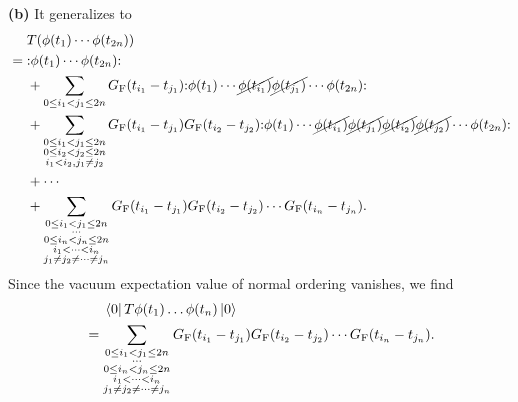 \documentclass{article}
\makeatletter
\newcommand*{\shifttext}[1]{%
  \settowidth{\@tempdima}{#1}%
  \hspace{-\@tempdima}#1%
}
\newcommand{\plabel}[1]{%
\shifttext{\textbf{#1}\quad}%
}
\makeatother
\begin{document}
\plabel{(b)}%
It generalizes to
\begin{align*}
    &\phantom{{}={}} T(\phi(t_1) \cdots \phi(t_{2n})) \\
    &= \normord{\phi(t_1) \cdots \phi(t_{2n})} \\
    &\phantom{{}={}} {} + \sum_{0\le i_1 < j_1 \le 2n} G_{\mathrm{F}}(t_{i_1} - t_{j_1}) \normord{\phi(t_1) \cdots \cancel{\phi(t_{i_1})} \cancel{\phi(t_{j_1})} \cdots \phi(t_{2n})} \\
    &\phantom{{}={}} {} + \sum_{\substack{0\le i_1 < j_1 \le 2n \\ 0\le i_2 < j_2 \le 2n \\ i_1 < i_2, j_1 \neq j_2}} G_{\mathrm{F}}(t_{i_1} - t_{j_1}) G_{\mathrm{F}}(t_{i_2} - t_{j_2}) \normord{\phi(t_1) \cdots \cancel{\phi(t_{i_1})} \cancel{\phi(t_{j_1})} \cancel{\phi(t_{i_2})} \cancel{\phi(t_{j_2})} \cdots \phi(t_{2n})} \\
    &\phantom{{}={}} + \cdots \\
    &\phantom{{}={}} + \sum_{\substack{0\le i_1 < j_1 \le 2n \\ \cdots \\ 0\le i_n < j_n \le 2n \\ i_1 < \cdots < i_n \\ j_1 \neq j_2 \neq \cdots \neq j_n}} G_{\mathrm{F}}(t_{i_1} - t_{j_1}) G_{\mathrm{F}}(t_{i_2} - t_{j_2}) \cdots G_{\mathrm{F}}(t_{i_n} - t_{j_n}).
\end{align*}
Since the vacuum expectation value of normal ordering vanishes, we find
\begin{align*}
    &\phantom{{}={}} \bra{0} T\phi(t_1) \dots \phi(t_n) \ket{0} \\
    &= \sum_{\substack{0\le i_1 < j_1 \le 2n \\ \cdots \\ 0\le i_n < j_n \le 2n \\ i_1 < \cdots < i_n \\ j_1 \neq j_2 \neq \cdots \neq j_n}} G_{\mathrm{F}}(t_{i_1} - t_{j_1}) G_{\mathrm{F}}(t_{i_2} - t_{j_2}) \cdots G_{\mathrm{F}}(t_{i_n} - t_{j_n}).
\end{align*}
\end{document}
